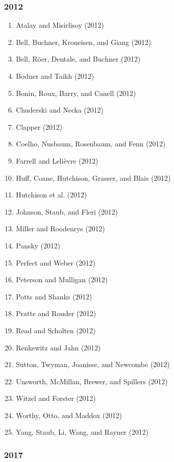 \documentclass[english,man]{apa6}
\providecommand{\tightlist}{%
  \setlength{\itemsep}{0pt}\setlength{\parskip}{0pt}}
\theoremstyle{definition}
\theoremstyle{definition}
\theoremstyle{definition}
\theoremstyle{remark}
\begin{document}
\subsubsection{2012}\label{section-6}

\begin{enumerate}
\def\labelenumi{\arabic{enumi})}
\tightlist
\item
  Atalay and Misirlisoy (2012)
\item
  Bell, Buchner, Kroneisen, and Giang (2012)
\item
  Bell, Röer, Dentale, and Buchner (2012)
\item
  Bodner and Taikh (2012)
\item
  Bonin, Roux, Barry, and Canell (2012)
\item
  Chuderski and Necka (2012)
\item
  Clapper (2012)
\item
  Coelho, Nusbaum, Rosenbaum, and Fenn (2012)
\item
  Farrell and Lelièvre (2012)
\item
  Huff, Coane, Hutchison, Grasser, and Blais (2012)
\item
  Hutchison et al. (2012)
\item
  Johnson, Staub, and Fleri (2012)
\item
  Miller and Roodenrys (2012)
\item
  Pansky (2012)
\item
  Perfect and Weber (2012)
\item
  Peterson and Mulligan (2012)
\item
  Potts and Shanks (2012)
\item
  Pratte and Rouder (2012)
\item
  Read and Scholten (2012)
\item
  Renkewitz and Jahn (2012)
\item
  Sutton, Twyman, Joanisse, and Newcombe (2012)
\item
  Unsworth, McMillan, Brewer, and Spillers (2012)
\item
  Witzel and Forster (2012)
\item
  Worthy, Otto, and Maddox (2012)
\item
  Yang, Staub, Li, Wang, and Rayner (2012)
\end{enumerate}

\subsubsection{2017}\label{section-7}
\end{document}
